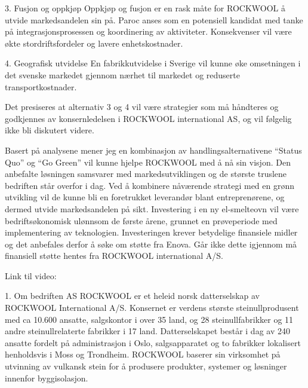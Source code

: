 3. Fusjon og oppkjøp
Oppkjøp og fusjon er en rask måte for ROCKWOOL å utvide markedsandelen sin på. Paroc anses som en potensiell kandidat med tanke på integrasjonsprosessen og koordinering av aktiviteter. Konsekvenser vil være økte stordriftsfordeler og lavere enhetskostnader.

4. Geografisk utvidelse
En fabrikkutvidelse i Sverige vil kunne øke omsetningen i det svenske markedet gjennom nærhet til markedet og reduserte transportkostnader.
 
Det presiseres at alternativ 3 og 4 vil være strategier som må håndteres og godkjennes av konsernledelsen i ROCKWOOL international AS, og vil følgelig ikke bli diskutert videre.

Basert på analysene mener jeg en kombinasjon av handlingsalternativene “Status Quo” og “Go Green” vil kunne hjelpe ROCKWOOL med å nå sin visjon.  Den anbefalte løsningen samsvarer med markedsutviklingen og de største truslene bedriften står overfor i dag. Ved å kombinere nåværende strategi med en grønn utvikling vil de kunne bli en foretrukket leverandør blant entreprenørene, og  dermed utvide markedsandelen på sikt. Investering i en ny el-smelteovn vil være bedriftsøkonomisk ulønnsom de første årene, grunnet en prøveperiode med implementering av teknologien. Investeringen krever betydelige finansiele midler og det anbefales derfor å søke om støtte fra Enova. Går ikke dette igjennom må finansiell støtte hentes fra ROCKWOOL international A/S. 

Link til video: 






















1. Om bedriften
AS ROCKWOOL er et heleid norsk datterselskap av ROCKWOOL International A/S. Konsernet er verdens største steinullprodusent med ca 10.600 ansatte, salgskontor i over 35 land, og 28 steinullfabrikker og 11 andre steinullrelaterte fabrikker i 17 land. Datterselskapet består i dag av 240 ansatte fordelt på administrasjon i Oslo, salgsapparatet og to fabrikker lokalisert henholdsvis i Moss og Trondheim. ROCKWOOL baserer sin virksomhet på utvinning av vulkansk stein for å produsere produkter, systemer og løsninger innenfor byggisolasjon.

